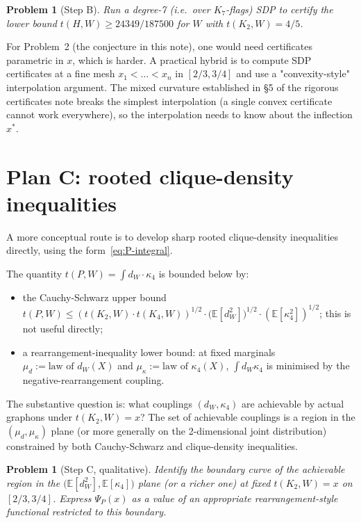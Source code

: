 \documentclass[11pt]{amsart}
\newtheorem{problem}[theorem]{Problem}
\theoremstyle{definition}
\newcommand{\E}{\mathbb E}
\begin{document}
\begin{problem}[Step B]
\label{prob:B}
Run a degree-7 (i.e.\ over $K_7$-flags) SDP to certify the lower bound
$t(H, W) \ge 24349/187500$ for $W$ with $t(K_2,W) = 4/5$.
\end{problem}

For Problem~2 (the conjecture in this note), one would need certificates
parametric in $x$, which is harder.  A practical hybrid is to compute SDP
certificates at a fine mesh $x_1<\dots<x_n$ in $[2/3,3/4]$ and use a
"convexity-style" interpolation argument.  The mixed curvature established
in §5 of the rigorous certificates note breaks the simplest interpolation
(a single convex certificate cannot work everywhere), so the interpolation
needs to know about the inflection $x^*$.

\section{Plan C: rooted clique-density inequalities}

A more conceptual route is to develop sharp rooted clique-density inequalities
directly, using the form~\eqref{eq:P-integral}.

The quantity $t(P,W) = \int d_W \cdot \kappa_4$ is bounded below by:
\begin{itemize}[itemsep=2pt]
\item the Cauchy-Schwarz upper bound $t(P,W)\le (t(K_2,W)\cdot
t(K_4,W))^{1/2}\cdot\bigl(\E[d_W^2]\bigr)^{1/2}\cdot(\E[\kappa_4^2])^{1/2}$;
this is not useful directly;
\item a rearrangement-inequality lower bound: at fixed marginals
$\mu_d := \text{law of } d_W(X)$ and $\mu_\kappa := \text{law of } \kappa_4(X)$,
$\int d_W \kappa_4$ is minimised by the negative-rearrangement coupling.
\end{itemize}

The substantive question is: what couplings $(d_W, \kappa_4)$ are achievable
by actual graphons under $t(K_2,W)=x$?  The set of achievable couplings is
a region in the $(\mu_d,\mu_\kappa)$ plane (or more generally on the
2-dimensional joint distribution) constrained by both Cauchy-Schwarz and
clique-density inequalities.

\begin{problem}[Step C, qualitative]
\label{prob:C}
Identify the boundary curve of the achievable region in the
$\bigl(\E[d_W^2], \E[\kappa_4]\bigr)$ plane (or a richer one) at fixed
$t(K_2,W)=x$ on $[2/3,3/4]$.  Express $\Psi_P(x)$ as a value of an appropriate
rearrangement-style functional restricted to this boundary.
\end{problem}
\end{document}
